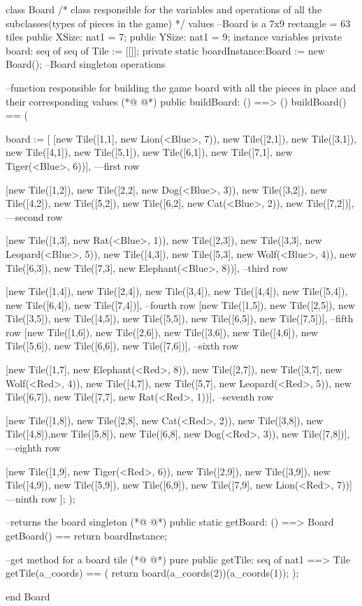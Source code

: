 \begin{vdmpp}[breaklines=true]
class Board
/*
class responsible for the variables and operations of all the subclasses(types of pieces in the game)
*/
values --Board is a 7x9 rectangle = 63 tiles
  public XSize: nat1 = 7;
  public YSize: nat1 = 9;
instance variables
  private board: seq of seq of Tile := [[]];
  private static boardInstance:Board := new Board(); --Board singleton
operations

  --function responsible for building the game board with all the pieces in place and their corresponding values
(*@
\label{buildBoard:14}
@*)
  public buildBoard: () ==> ()
  buildBoard() == (
  
   board := [
    [new Tile([1,1], new Lion(<Blue>, 7)), new Tile([2,1]), new Tile([3,1]), new Tile([4,1]), new Tile([5,1]), new Tile([6,1]), new Tile([7,1], new Tiger(<Blue>, 6))], ---first row
    
    [new Tile([1,2]), new Tile([2,2], new Dog(<Blue>, 3)), new Tile([3,2]), new Tile([4,2]), new Tile([5,2]), new Tile([6,2], new Cat(<Blue>, 2)), new Tile([7,2])], ---second row
    
    [new Tile([1,3], new Rat(<Blue>, 1)), new Tile([2,3]), new Tile([3,3], new Leopard(<Blue>, 5)), new Tile([4,3]), new Tile([5,3], new Wolf(<Blue>, 4)), new Tile([6,3]), new Tile([7,3], new Elephant(<Blue>, 8))], --third row
    
    [new Tile([1,4]), new Tile([2,4]), new Tile([3,4]), new Tile([4,4]), new Tile([5,4]), new Tile([6,4]), new Tile([7,4])], --fourth row
    [new Tile([1,5]), new Tile([2,5]), new Tile([3,5]), new Tile([4,5]), new Tile([5,5]), new Tile([6,5]), new Tile([7,5])], --fifth row
    [new Tile([1,6]), new Tile([2,6]), new Tile([3,6]), new Tile([4,6]), new Tile([5,6]), new Tile([6,6]), new Tile([7,6])], --sixth row
    
    [new Tile([1,7], new Elephant(<Red>, 8)), new Tile([2,7]), new Tile([3,7], new Wolf(<Red>, 4)), new Tile([4,7]), new Tile([5,7], new Leopard(<Red>, 5)), new Tile([6,7]), new Tile([7,7], new Rat(<Red>, 1))], --seventh row
    
    [new Tile([1,8]), new Tile([2,8], new Cat(<Red>, 2)), new Tile([3,8]), new Tile([4,8]),new Tile([5,8]), new Tile([6,8], new Dog(<Red>, 3)), new Tile([7,8])], ---eighth row
    
    [new Tile([1,9], new Tiger(<Red>, 6)), new Tile([2,9]), new Tile([3,9]), new Tile([4,9]), new Tile([5,9]), new Tile([6,9]), new Tile([7,9], new Lion(<Red>, 7))] ---ninth row
    ];
  );
  
  --returns the board singleton
(*@
\label{getBoard:37}
@*)
  public static getBoard: () ==> Board
  getBoard() == return boardInstance;
  
  --get method for a board tile
(*@
\label{getTile:41}
@*)
  pure public getTile: seq of nat1 ==> Tile
  getTile(a_coords) == (
    return board(a_coords(2))(a_coords(1));
  );

end Board
\end{vdmpp}
